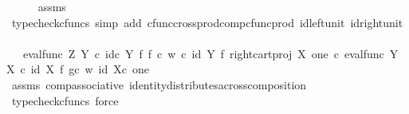 \begin{isabellebody}
\ \ \ \ \isamarkupfalse%
\ assms\ \isamarkupfalse%
\ {\isacharparenleft}{\kern0pt}typecheck{\isacharunderscore}{\kern0pt}cfuncs{\isacharcomma}{\kern0pt}\ simp\ add{\isacharcolon}{\kern0pt}\ cfunc{\isacharunderscore}{\kern0pt}cross{\isacharunderscore}{\kern0pt}prod{\isacharunderscore}{\kern0pt}comp{\isacharunderscore}{\kern0pt}cfunc{\isacharunderscore}{\kern0pt}prod\ id{\isacharunderscore}{\kern0pt}left{\isacharunderscore}{\kern0pt}unit{}\ id{\isacharunderscore}{\kern0pt}right{\isacharunderscore}{\kern0pt}unit{}{\isacharparenright}{\kern0pt}\isanewline
\ \ \isamarkupfalse%
\ \isamarkupfalse%
\ {\isachardoublequoteopen}{\isachardot}{\kern0pt}{\isachardot}{\kern0pt}{\isachardot}{\kern0pt}\ {\isacharequal}{\kern0pt}\ {\isacharparenleft}{\kern0pt}eval{\isacharunderscore}{\kern0pt}func\ Z\ Y\ {\isasymcirc}\isactrlsub c\ {\isacharparenleft}{\kern0pt}id\isactrlsub c\ Y\ {\isasymtimes}\isactrlsub f\ {\isacharparenleft}{\kern0pt}f\ {\isasymcirc}\isactrlsub c\ w{\isacharparenright}{\kern0pt}{\isacharparenright}{\kern0pt}\ {\isasymcirc}\isactrlsub c\ {\isacharparenleft}{\kern0pt}id\ {\isacharparenleft}{\kern0pt}Y{\isacharparenright}{\kern0pt}\ {\isasymtimes}\isactrlsub f\ right{\isacharunderscore}{\kern0pt}cart{\isacharunderscore}{\kern0pt}proj\ X\ one{\isacharparenright}{\kern0pt}\ {\isasymcirc}\isactrlsub c\ {\isasymlangle}eval{\isacharunderscore}{\kern0pt}func\ Y\ X\ {\isasymcirc}\isactrlsub c\ {\isacharparenleft}{\kern0pt}id\ X\ {\isasymtimes}\isactrlsub f\ {\isacharparenleft}{\kern0pt}g{\isasymcirc}\isactrlsub c\ w{\isacharparenright}{\kern0pt}{\isacharparenright}{\kern0pt}{\isacharcomma}{\kern0pt}\ id\ {\isacharparenleft}{\kern0pt}X{\isasymtimes}\isactrlsub c\ one{\isacharparenright}{\kern0pt}{\isasymrangle}{\isacharparenright}{\kern0pt}\isactrlsup {\isasymsharp}{\isachardoublequoteclose}\isanewline
\ \ \ \ \isamarkupfalse%
\ assms\ comp{\isacharunderscore}{\kern0pt}associative{}\ identity{\isacharunderscore}{\kern0pt}distributes{\isacharunderscore}{\kern0pt}across{\isacharunderscore}{\kern0pt}composition\ \isamarkupfalse%
\ {\isacharparenleft}{\kern0pt}typecheck{\isacharunderscore}{\kern0pt}cfuncs{\isacharcomma}{\kern0pt}\ force{\isacharparenright}{\kern0pt}\isanewline
\ \ \isamarkupfalse%
\ \isamarkupfalse%

\end{isabellebody}
